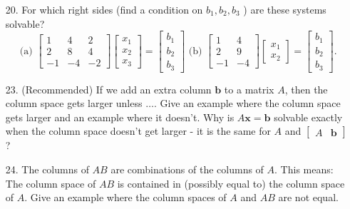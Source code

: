 \documentclass[main.tex]{subfiles}
\begin{document}
\begin{enumerate}
    \item [20.] For which right sides (find a condition on $b_{1}, b_{2}, b_{3}$ ) are these systems solvable?
    $$
    \text{ (a) } \left[\begin{array}{rrr}1 & 4 & 2 \\ 2 & 8 & 4 \\ -1 & -4 & -2\end{array}\right]\left[\begin{array}{l}x_{1} \\ x_{2} \\ x_{3}\end{array}\right]=\left[\begin{array}{l}b_{1} \\ b_{2} \\ b_{3}\end{array}\right]
    \text{ (b) } \left[\begin{array}{rr}1 & 4 \\ 2 & 9 \\ -1 & -4\end{array}\right]\left[\begin{array}{l}x_{1} \\ x_{2}\end{array}\right]=\left[\begin{array}{l}b_{1} \\ b_{2} \\ b_{3}\end{array}\right].
    $$
    
    \item [23.] (Recommended) If we add an extra column $\bm{b}$ to a matrix $A$, then the column space gets larger unless $\dots$. Give an example where the column space gets larger and an example where it doesn't. Why is $A \bm{x}=\bm{b}$ solvable exactly when the column space doesn't get larger - it is the same for $A$ and $\left[\begin{array}{ll}A & \bm{b}\end{array}\right]$ ?
    
    \item [24.] The columns of $A B$ are combinations of the columns of $A$. This means: The column space of $A B$ is contained in (possibly equal to) the column space of $A$. Give an example where the column spaces of $A$ and $A B$ are not equal.
    
\end{enumerate}
\end{document}

